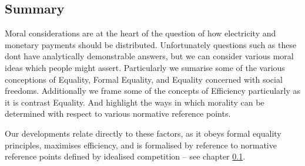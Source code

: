\subsection{Summary}

Moral considerations are at the heart of the question of how electricity and monetary payments should be distributed.
Unfortunately questions such as these dont have analytically demonstrable answers, but we can consider various moral ideas which people might assert.
Particularly we sumarise some of the various conceptions of Equality, Formal Equality, and Equality concerned with social freedoms.
Additionally we frame some of the concepts of Efficiency particularly as it is contrast Equality.
And highlight the ways in which morality can be determined with respect to various normative reference points.

Our developments relate directly to these factors, as it obeys formal equality principles, maximises efficiency, and is formalised by reference to normative reference points defined by idealised competition -- see chapter \ref{}.




